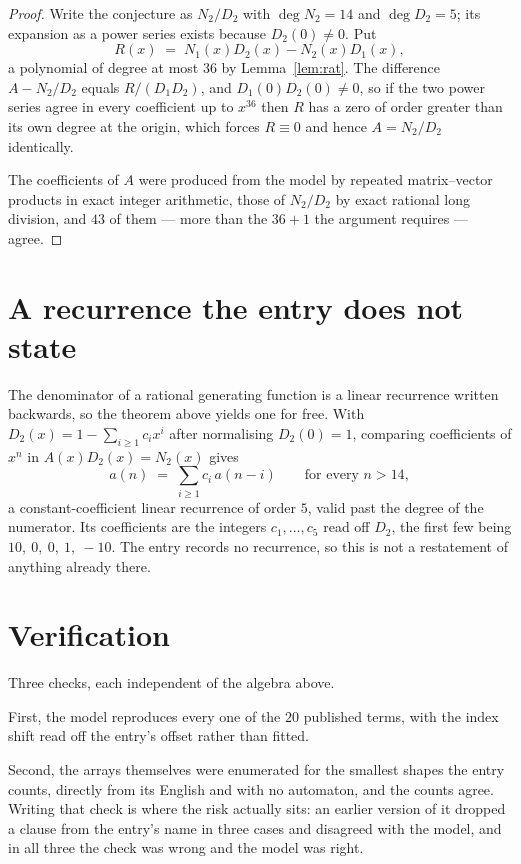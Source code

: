 \documentclass[11pt,a4paper]{article}
\theoremstyle{plain}
\theoremstyle{definition}
\begin{document}
\begin{proof}
Write the conjecture as $N_2/D_2$ with $\deg N_2=14$ and $\deg D_2=5$; its expansion as a
power series exists because $D_2(0)\neq0$. Put
\[
R(x)\;=\;N_1(x)D_2(x)-N_2(x)D_1(x),
\]
a polynomial of degree at most $36$ by Lemma~\ref{lem:rat}. The difference
$A-N_2/D_2$ equals $R/(D_1D_2)$, and $D_1(0)D_2(0)\neq0$, so if the two power series agree in
every coefficient up to $x^{36}$ then $R$ has a zero of order greater than its own
degree at the origin, which forces $R\equiv0$ and hence $A=N_2/D_2$ identically.

The coefficients of $A$ were produced from the model by repeated matrix--vector products in
exact integer arithmetic, those of $N_2/D_2$ by exact rational long division, and $43$
of them --- more than the $36+1$ the argument requires --- agree.
\end{proof}

\section{A recurrence the entry does not state}

The denominator of a rational generating function is a linear recurrence written backwards, so
the theorem above yields one for free. With $D_2(x)=1-\sum_{i\ge1}c_ix^i$ after normalising
$D_2(0)=1$, comparing coefficients of $x^n$ in $A(x)D_2(x)=N_2(x)$ gives
\[
a(n)\;=\;\sum_{i\ge1}c_i\,a(n-i)\qquad\text{for every }n>14,
\]
a constant-coefficient linear recurrence of order $5$, valid past the degree of the
numerator. Its coefficients are the integers $c_1,\dots,c_{5}$ read off $D_2$, the first few being $10,\ 0,\ 0,\ 1,\ -10$. The entry records no recurrence, so this is not a restatement of anything
already there.

\section{Verification}

Three checks, each independent of the algebra above.

First, the model reproduces every one of the $20$ published terms, with the index shift
read off the entry's offset rather than fitted.

Second, the arrays themselves were enumerated for the smallest shapes the entry counts,
directly from its English and with no automaton, and the counts agree. Writing that check is
where the risk actually sits: an earlier version of it dropped a clause from the entry's name
in three cases and disagreed with the model, and in all three the check was wrong and the model
was right.
\end{document}
